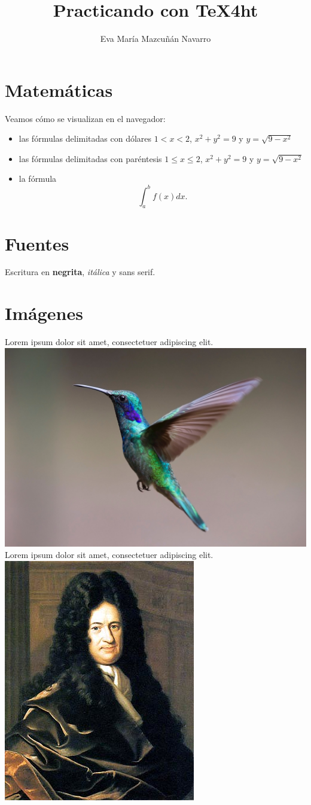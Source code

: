 \documentclass[12pt,a4paper,twoside]{article}
\title{Practicando con \TeX4ht{}}
\author{Eva María Mazcuñán Navarro}
\begin{document}
\maketitle


\section{Matemáticas}
Veamos cómo se visualizan en el navegador:

\begin{itemize}
	\item las fórmulas delimitadas con dólares $1<x<2$, $x^2+y^2=9$ y $y=\sqrt{9-x^2}$
	
	\item las fórmulas delimitadas con paréntesis \(1\le x \le 2\), \(x^2+y^2=9\) y  \(y=\sqrt{9-x^2}\)
	
	\item la fórmula \[\int_a^b f(x)dx.\]
\end{itemize}

\section{Fuentes}

Escritura en \textbf{\bfseries negrita}, \textit{\itshape itálica} y \textsf{\sffamily sans serif}.

\section{Imágenes}

\noindent Lorem ipsum dolor sit amet, consectetuer adipiscing elit.\\
\noindent\includegraphics[width=.4\textwidth]{images/bird.jpg}\\
\noindent Lorem ipsum dolor sit amet, consectetuer adipiscing elit.\\
\noindent\includegraphics[width=.4\textwidth]{images/GWLeibniz.png}
\end{document}

